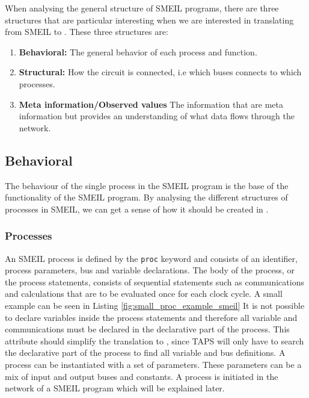 When analysing the general structure of SMEIL programs, there are three structures that are particular interesting when we are interested in translating from SMEIL to \cspm{}. These three structures are:
\begin{enumerate}
    \item \textbf{Behavioral:} The general behavior of each process and function.
    \item \textbf{Structural:} How the circuit is connected, i.e which buses connects to which processes.
    \item \textbf{Meta information/Observed values} %
    The information that are meta information but provides an understanding of what data flows through the network.
\end{enumerate}


\subsection{Behavioral}
The behaviour of the single process in the SMEIL program is the base of the functionality of the SMEIL program. By analysing the different structures of processes in SMEIL, we can get a sense of how it should be created in \cspm.
\subsubsection{Processes}

An SMEIL process is defined by the \texttt{proc} keyword and consists of an identifier, process parameters, bus and variable declarations. The body of the process, or the process statements, consists of sequential statements such as communications and calculations that are to be evaluated once for each clock cycle. A small example can be seen in Listing \ref{fig:small_proc_example_smeil}
It is not possible to declare variables inside the process statements and therefore all variable and communications must be declared in the declarative part of the process. This attribute should simplify the translation to \cspm, since TAPS will only have to search the declarative part of the process to find all variable and bus definitions.
A process can be instantiated with a set of parameters. These parameters can be a mix of input and output buses and constants. A process is initiated in the network of a SMEIL program which will be explained later.

